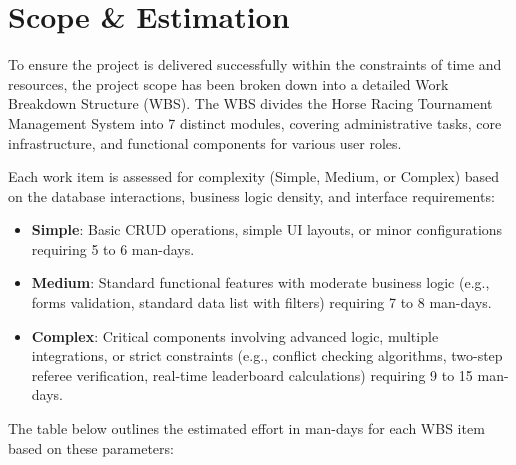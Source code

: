 \section{Scope \& Estimation}

To ensure the project is delivered successfully within the constraints of time and resources, the project scope has been broken down into a detailed Work Breakdown Structure (WBS). The WBS divides the Horse Racing Tournament Management System into 7 distinct modules, covering administrative tasks, core infrastructure, and functional components for various user roles.

Each work item is assessed for complexity (Simple, Medium, or Complex) based on the database interactions, business logic density, and interface requirements:
\begin{itemize}
    \item \textbf{Simple}: Basic CRUD operations, simple UI layouts, or minor configurations requiring 5 to 6 man-days.
    \item \textbf{Medium}: Standard functional features with moderate business logic (e.g., forms validation, standard data list with filters) requiring 7 to 8 man-days.
    \item \textbf{Complex}: Critical components involving advanced logic, multiple integrations, or strict constraints (e.g., conflict checking algorithms, two-step referee verification, real-time leaderboard calculations) requiring 9 to 15 man-days.
\end{itemize}

The table below outlines the estimated effort in man-days for each WBS item based on these parameters:

